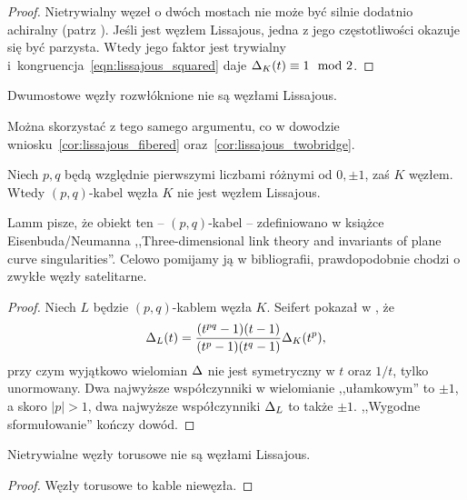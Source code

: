 \begin{proof}
    Nietrywialny węzeł o dwóch mostach nie może być silnie dodatnio achiralny (patrz \cite{hartley79}).
    Jeśli jest węzłem Lissajous, jedna z jego częstotliwości okazuje się być parzysta.
    Wtedy jego faktor jest trywialny i~kongruencja~\ref{eqn:lissajous_squared} daje $\Delta_K(t) \equiv 1 \mod 2$.
\end{proof}

\begin{corollary}
%
    Dwumostowe węzły rozwłóknione nie są węzłami Lissajous.
\end{corollary}

Można skorzystać z tego samego argumentu, co w dowodzie wniosku~\ref{cor:lissajous_fibered} oraz~\ref{cor:lissajous_twobridge}.

\begin{proposition}
    Niech $p, q$ będą względnie pierwszymi liczbami różnymi od $0, \pm 1$, zaś $K$ węzłem.
    Wtedy $(p, q)$-kabel węzła $K$ nie jest węzłem Lissajous.
\end{proposition}

Lamm pisze, że obiekt ten -- $(p, q)$-kabel -- zdefiniowano w książce Eisenbuda/Neumanna ,,Three-dimensional link theory and invariants of plane curve singularities''.
%
%
Celowo pomijamy ją w bibliografii, prawdopodobnie chodzi o zwykłe węzły satelitarne.

\begin{proof}
%
    Niech $L$ będzie $(p, q)$-kablem węzła $K$.
    Seifert pokazał w \cite{seifert50}, że
    \begin{equation}
        \Delta_L(t) = \frac{(t^{pq}-1)(t-1)}{(t^p-1)(t^q-1)} \Delta_K(t^p),
    \end{equation}
    przy czym wyjątkowo wielomian $\Delta$ nie jest symetryczny w $t$ oraz $1/t$, tylko unormowany.
    Dwa najwyższe współczynniki w wielomianie ,,ułamkowym'' to $\pm 1$, a skoro $|p| > 1$, dwa najwyższe współczynniki $\Delta_L$ to także $\pm 1$.
    ,,Wygodne sformułowanie'' kończy dowód.
\end{proof}

\begin{corollary}
%
    Nietrywialne węzły torusowe nie są węzłami Lissajous.
\end{corollary}

\begin{proof}
    Węzły torusowe to kable niewęzła.
\end{proof}

